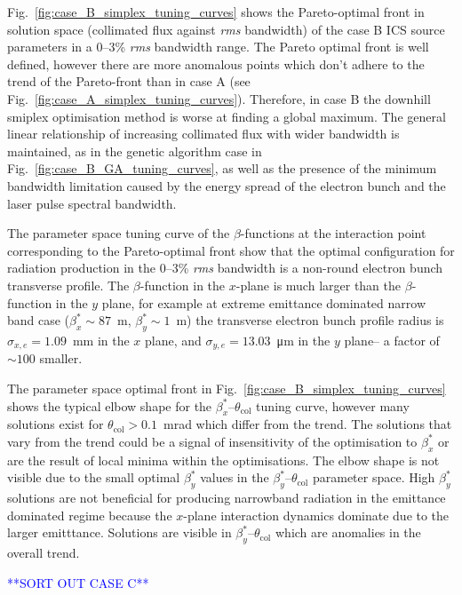 \documentclass[../main.tex]{subfiles}
\begin{document}
Fig.~\ref{fig:case_B_simplex_tuning_curves} shows the Pareto-optimal front in solution space (collimated flux against \textit{rms} bandwidth) of the case B ICS source parameters in a 0--3\% \textit{rms} bandwidth range. The Pareto optimal front is well defined, however there are more anomalous points which don't adhere to the trend of the Pareto-front than in case A (see Fig.~\ref{fig:case_A_simplex_tuning_curves}). Therefore, in case B the downhill smiplex optimisation method is worse at finding a global maximum. The general linear relationship of increasing collimated flux with wider bandwidth is maintained, as in the genetic algorithm case in Fig.~\ref{fig:case_B_GA_tuning_curves}, as well as the presence of the minimum bandwidth limitation caused by the energy spread of the electron bunch and the laser pulse spectral bandwidth.

The parameter space tuning curve of the $\beta$-functions at the interaction point corresponding to the Pareto-optimal front show that the optimal configuration for radiation production in the 0--3\% \textit{rms} bandwidth is a non-round electron bunch transverse profile. The $\beta$-function in the $x$-plane is much larger than the $\beta$-function in the $y$ plane, for example at extreme emittance dominated narrow band case ($\beta_{x}^{*}\sim87$~\si{\meter}, $\beta_{y}^{*} \sim1$~\si{\meter}) the transverse electron bunch profile radius is $\sigma_{x,e} =1.09$~\si{\milli\meter} in the $x$ plane, and $\sigma_{y,e} =13.03$~\si{\micro\meter} in the $y$ plane-- a factor of $\sim100$ smaller.

The parameter space optimal front in Fig.~\ref{fig:case_B_simplex_tuning_curves} shows the typical elbow shape for the $\beta_{x}^{*}$--$\theta_{\mathrm{col}}$ tuning curve, however many solutions exist for $\theta_{\mathrm{col}} > 0.1$~\si{\milli\radian} which differ from the trend. The solutions that vary from the trend could be a signal of insensitivity of the optimisation to $\beta_{x}^{*}$ or are the result of local minima within the optimisations. The elbow shape is not visible due to the small optimal $\beta_{y}^{*}$ values in the $\beta_{y}^{*}$--$\theta_{\mathrm{col}}$ parameter space. High $\beta_{y}^{*}$ solutions are not beneficial for producing narrowband radiation in the emittance dominated regime because the $x$-plane interaction dynamics dominate due to the larger emitttance. Solutions are visible in $\beta_{y}^{*}$--$\theta_{\mathrm{col}}$ which are anomalies in the overall trend. 

\textcolor{blue}{**SORT OUT CASE C**}
\end{document}
